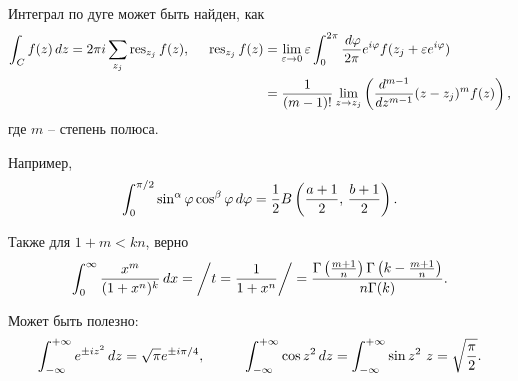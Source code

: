 
Интеграл по дуге может быть найден, как
\begin{align*}
    \int_C f(z) \, d z = 2 \pi i \sum_{z_j} \mathop{\mathrm{res}}\nolimits_{z_j} f(z),
    \hspace{5 mm} 
    \mathop{\mathrm{res}}\nolimits_{z_j} f(z) &= \lim_{\varepsilon \to 0} \varepsilon \int_0^{2\pi} \frac{\, d \varphi}{2\pi} e^{i \varphi} f(z_j + \varepsilon e^{i \varphi}) \\ 
    &= \frac{1}{(m-1)!} \lim_{z \to z_j} \left(
        \frac{d^{m-1} }{d z^{m-1}} (z-z_j)^m f(z)
    \right),
\end{align*}
где $m$ -- степень полюса. 



Например,
\begin{equation*}
    \int_0^{\pi/2} \sin^\alpha \varphi \cos^\beta \varphi \, d \varphi =  \frac{1}{2} B\left(\frac{a+1}{2},\, \frac{b+1}{2}\right).
\end{equation*}



Также для $1 + m < kn$, верно
\begin{equation*}
    \int_{0}^{\infty}  \frac{x^m}{(1+x^n)^k} \, d x = \bigg/
        t = \frac{1}{1+x^n}
    \bigg/ = \frac{\Gamma \left(\frac{m+1}{n}\right) \Gamma \left(k-\frac{m+1}{n}\right)}{n \Gamma (k)}.
\end{equation*}




Может быть полезно:
\begin{equation*}
    \int_{-\infty}^{+\infty} e^{\pm i z^2} \d z = \sqrt{\pi} e^{\pm i \pi / 4},
    \hspace{10 mm} 
    \int_{-\infty}^{+\infty} \cos z^2 \d z = \int_{-\infty}^{+\infty} \sin z^2 \ z = \sqrt{\frac{\pi}{2}}.
\end{equation*}




